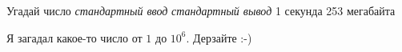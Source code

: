 \begin{problem}%
{Угадай число}%
{\textsl{стандартный ввод}}%
{\textsl{стандартный вывод}}%
{1 секунда}%
{253 мегабайта}{}

Я загадал какое-то число от $1$ до $10^6$. Дерзайте :-)

\end{problem}

